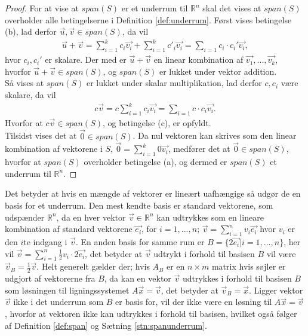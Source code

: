 \begin{proof}
For at vise at $span(S)$ er et underrum til $\mathds{R}^n$ skal det vises at $span(S)$ overholder alle betingelserne i Definition \ref{def:underrum}.
Først vises betingelse (b), lad  derfor $\vec{u}, \vec{v} \in span(S)$, da vil 
\begin{align*}
\vec{u}+\vec{v}= \sum_{i=1}^k c_i \vec{v_i} + \sum_{i=1}^k c'_i \vec{v_i} = \sum_{i=1} c_i\cdot c_i' \vec{v_i},
\end{align*}
hvor $c_i, c_i'$ er skalare.
Der med er $\vec{u}+\vec{v}$ en linear kombination af $\vec{v_1},...,\vec{v_k}$, hvorfor $\vec{u}+\vec{v} \in span(S)$, og $span(S)$ er lukket under vektor addition.
\\ Så vises at $span(S)$ er lukket under skalar multiplikation, lad derfor $c, c_i$ være skalare, da vil
\begin{align*}
c\vec{v}= c\sum_{i=1}^k c_i \vec{v_i}  = \sum_{i=1} c \cdot c_i \vec{v_i}.
\end{align*}
Hvorfor at $c\vec{v} \in span(S)$, og betingelse (c), er opfyldt.
\\Tilsidst vises det at $\vec{0} \in span(S)$.
Da nul vektoren kan skrives som den linear kombination af vektorene i $S$, $\vec{0} = \sum_{i=1}^k 0 \vec{v_i}$, medfører det at $\vec{0} \in span(S)$, hvorfor at $span(S)$ overholder betingelse (a), og dermed er $span(S)$ et underrum til $\mathds{R}^n$.
\end{proof}
Det betyder at hvis en mængde af vektorer er lineært uafhængige så udgør de en basis for et underrum. 
Den mest kendte basis er standard vektorene, som udspænder $\mathds{R}^n$, da en hver vektor $\vec{v} \in \mathds{R}^n$ kan udtrykkes som en lineare kombination af standard vektorene $\vec{e_i}$, for $i = 1,..., n$; $\vec{v}= \sum_{i=1}^n v_i \vec{e_i}$ hvor $v_i$ er den $i$te indgang i $\vec{v}$.
En anden basis for samme rum er $B=\{2\vec{e_i}| i =1,...,n\}$, her vil $\vec{v} = \sum_{i=1}^n \frac{1}{2} v_i \cdot 2\vec{e_i}$, det betyder at $\vec{v}$ udtrykt i forhold til basisen $B$ vil være $\vec{v}_B = \frac{1}{2}\vec{v}$.
Helt generelt gælder der; hvis $A_B$ er en $n \times m$ matrix hvis søjler er udgjort af vektorerne fra $B$, da kan en vektor $\vec{v}$ udtrykkes i forhold til basisen $B$ som løsningen til ligningssystemet $A \vec{x} =\vec{v}$, det betyder at $\vec{v}_B =  \vec{x}$. 
Ligger vektor $\vec{v}$ ikke i det underrum som $B$ er basis for, vil der ikke være en løsning til $A \vec{x} =\vec{v}$, hvorfor at vektoren ikke kan udtrykkes i forhold til basisen, hvilket også følger af Definition \ref{def:span} og Sætning \ref{stn:spanunderrum}.
